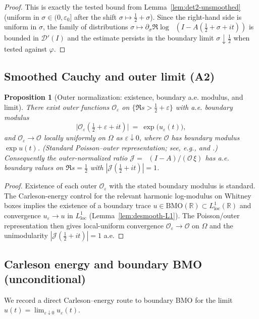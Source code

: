 \documentclass[11pt]{article}
\newtheorem{proposition}[theorem]{Proposition}
\theoremstyle{definition}
\theoremstyle{remark}
\theoremstyle{definition}
\newcommand{\R}{\mathbb{R}}
\DeclareMathOperator{\dettwo}{det_2}
\begin{document}
\begin{proof}
This is exactly the tested bound from Lemma~\ref{lem:det2-unsmoothed} (uniform in $\sigma\in(0,\varepsilon_0]$ after the shift $\sigma\mapsto \tfrac12+\sigma$). Since the right-hand side is uniform in $\sigma$, the family of distributions $\sigma\mapsto \partial_\sigma\Re\log\dettwo(I-A(\tfrac12+\sigma+it))$ is bounded in $\mathcal D'(I)$ and the estimate persists in the boundary limit $\sigma\downarrow\tfrac12$ when tested against $\varphi$.
\end{proof}
\subsection*{Smoothed Cauchy and outer limit (A2)}
\begin{proposition}[Outer normalization: existence, boundary a.e. modulus, and limit]\label{prop:outer-central}
There exist outer functions \(\mathcal O_\varepsilon\) on \(\{\Re s>\tfrac12+\varepsilon\}\) with a.e. boundary modulus
\[
  \big|\mathcal O_\varepsilon(\tfrac12+\varepsilon+it)\big|\ =\ \exp\big(u_\varepsilon(t)\big),
\]
and \(\mathcal O_\varepsilon\to\mathcal O\) locally uniformly on \(\Omega\) as \(\varepsilon\downarrow 0\), where \(\mathcal O\) has boundary modulus \(\exp u(t)\). (Standard Poisson–outer representation; see, e.g., \cite[Ch.~2]{DurenHp} and \cite[Ch.~2]{RosenblumRovnyak}.) Consequently the outer-normalized ratio \(\mathcal J=\dettwo(I-A)/(\mathcal O\,\xi)\) has a.e. boundary values on \(\Re s=\tfrac12\) with \(|\mathcal J(\tfrac12+it)|=1\).
\end{proposition}
\begin{proof}
Existence of each outer $\mathcal O_\varepsilon$ with the stated boundary modulus is standard. The Carleson-energy control for the relevant harmonic log-modulus on Whitney boxes implies the existence of a boundary trace $u\in \mathrm{BMO}(\R)\subset L^1_{\mathrm{loc}}(\R)$ and convergence $u_\varepsilon\to u$ in $L^1_{\mathrm{loc}}$ (Lemma~\ref{lem:desmooth-L1}). The Poisson/outer representation then gives local-uniform convergence $\mathcal O_\varepsilon\to\mathcal O$ on $\Omega$ and the unimodularity $|\mathcal J(\tfrac12+it)|=1$ a.e.
\end{proof}
\subsection*{Carleson energy and boundary BMO (unconditional)}
We record a direct Carleson–energy route to boundary BMO for the limit $u(t)=\lim_{\varepsilon\downarrow 0}u_\varepsilon(t)$.
\end{document}
